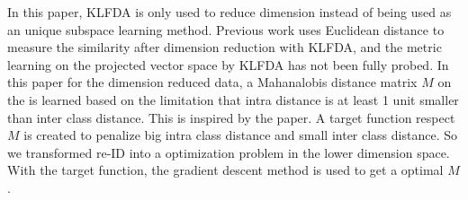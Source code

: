 \documentclass[conference,compsoc]{IEEEtran}
\begin{document}
\indent In this paper, KLFDA is only used to reduce dimension instead of being used as an unique subspace learning method. Previous work uses Euclidean distance to measure the similarity after dimension reduction with KLFDA, and the metric learning on the projected vector space by KLFDA has not been fully probed. In this paper for the dimension reduced data, a Mahanalobis distance matrix $M$ on the  is learned based on the limitation that intra distance is at least 1 unit smaller than inter class distance. This is inspired by the \cite{TDL} paper. A target function respect $M$ is created to penalize big intra class distance and small inter class distance. So we transformed re-ID into a optimization problem in the lower dimension space. With the target function, the gradient descent method is used to get a optimal $M$.





%

%
%


%
%
\end{document}
